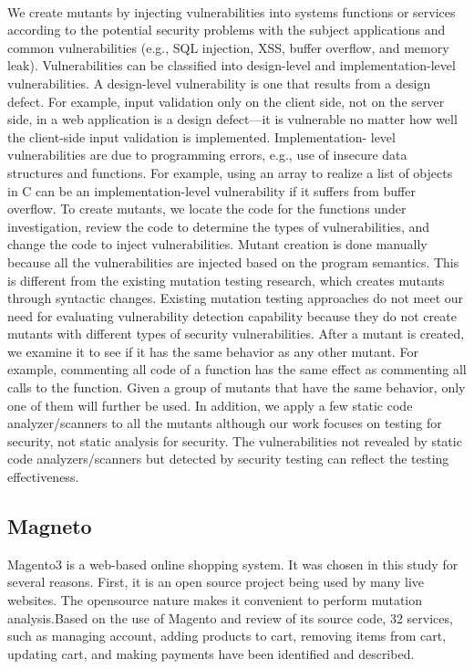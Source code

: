 \paragraph*{}
We create mutants by injecting vulnerabilities
into systems functions or services according to the potential
security problems with the subject applications and
common vulnerabilities (e.g., SQL injection, XSS, buffer
overflow, and memory leak). Vulnerabilities can be classified
into design-level and implementation-level vulnerabilities.
A design-level vulnerability is one that results from a
design defect. For example, input validation only on the
client side, not on the server side, in a web application is a
design defect—it is vulnerable no matter how well the
client-side input validation is implemented. Implementation-
level vulnerabilities are due to programming errors,
e.g., use of insecure data structures and functions. For
example, using an array to realize a list of objects in C can
be an implementation-level vulnerability if it suffers from
buffer overflow. To create mutants, we locate the code for
the functions under investigation, review the code to
determine the types of vulnerabilities, and change the code
to inject vulnerabilities. Mutant creation is done manually
because all the vulnerabilities are injected based on the
program semantics. This is different from the existing
mutation testing research, which creates mutants through
syntactic changes. Existing mutation testing approaches
do not meet our need for evaluating vulnerability detection
capability because they do not create mutants with different
types of security vulnerabilities. After a mutant is created,
we examine it to see if it has the same behavior as any other
mutant. For example, commenting all code of a function has
the same effect as commenting all calls to the function.
Given a group of mutants that have the same behavior, only
one of them will further be used. In addition, we apply a
few static code analyzer/scanners to all the mutants
although our work focuses on testing for security, not static
analysis for security. The vulnerabilities not revealed by
static code analyzers/scanners but detected by security
testing can reflect the testing effectiveness.
\subsection{\large Magneto}
Magento3 is a web-based online shopping system. It was
chosen in this study for several reasons. First, it is an open
source project being used by many live websites. The opensource
nature makes it convenient to perform mutation
analysis.Based on the use of Magento and
review of its source code, 32 services, such as managing account, adding products to cart, removing items from cart, updating cart, and making
payments have been identified and described.
